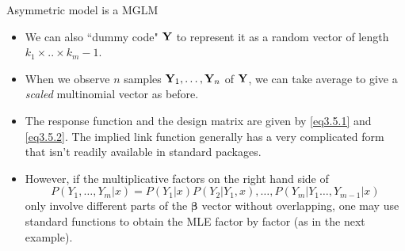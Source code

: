 \documentclass{beamer}
\newcommand{\boldbeta}{{\boldsymbol \beta}}
\newenvironment{wideitemize}%
  {\begin{itemize}%
    \setlength{\parskip}{1em}}%
  {\end{itemize}}
\begin{document}
\begin{frame} {Asymmetric model is a MGLM}
\begin{wideitemize}

\item We can also  ``dummy code"  ${\bf Y}$ to represent it as  a random vector of length $k_1 \times .. \times  k_m - 1$.  

\item When we observe $n$ samples ${\bf Y}_1, \dots, {\bf Y}_n$ of $\bf Y$, we can take average to give a \emph{scaled} multinomial vector as before.

\item The response function  and the design matrix  are given by \eqref{eq3.5.1} and \eqref{eq3.5.2}. The implied link function generally has a very complicated form that isn't readily available in standard packages. 


\item However, if the  multiplicative factors on the right hand side of 
\[
P(Y_1, \dots, Y_m|x) = P(Y_1 |x) P(Y_2 | Y_1, x), \dots, P(Y_m|Y_1 \dots,  Y_{m-1} |x)
\]
only involve different parts of the $\boldbeta$ vector without overlapping, one may use standard functions to obtain the MLE factor by factor (as in the next example).  
%
\end{wideitemize}

\end{frame}
%
%
%
%
\end{document}
